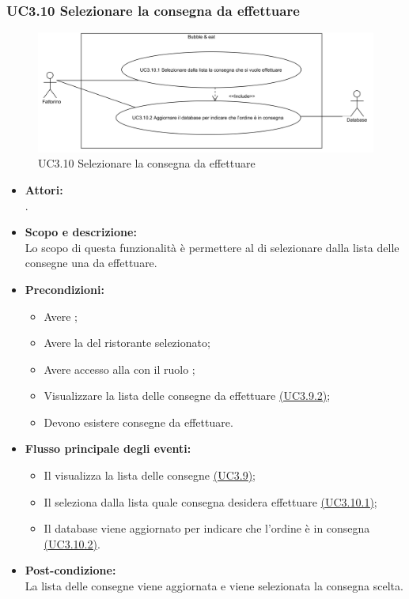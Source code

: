 \subsubsection{UC3.10 Selezionare la consegna da effettuare} \label{UC3.10}

\begin{figure}[H]
	\centering
	\includegraphics[width=15cm]{../../documenti/AnalisiDeiRequisiti/Diagrammi_img/uc3_10.png}
	\caption{UC3.10 Selezionare la consegna da effettuare}
\end{figure}

\begin{itemize}
	\item \textbf{Attori:}
	\\.
	\item \textbf{Scopo e descrizione:} 
	\\Lo scopo di questa funzionalità è permettere al  di selezionare dalla lista delle consegne una da effettuare.
	\item \textbf{Precondizioni:}
	\begin{itemize}
		\item Avere ;
		\item Avere la  del ristorante selezionato;
		\item Avere accesso alla  con il ruolo ;
		\item Visualizzare la lista delle consegne da effettuare \hyperref[UC3.9.2]{(UC3.9.2)};
		\item Devono esistere consegne da effettuare.
	\end{itemize}
	\item \textbf{Flusso principale degli eventi:}
	\begin{itemize}
		\item Il  visualizza la lista delle consegne \hyperref[UC3.9]{(UC3.9)};
		\item Il  seleziona dalla lista quale consegna desidera effettuare \hyperref[UC3.10.1]{(UC3.10.1)};
		\item Il database viene aggiornato per indicare che l'ordine è in consegna \hyperref[UC3.10.2]{(UC3.10.2)}.
	\end{itemize}
	\item \textbf{Post-condizione:}
	\\La lista delle consegne viene aggiornata e viene selezionata la consegna scelta.
\end{itemize}

